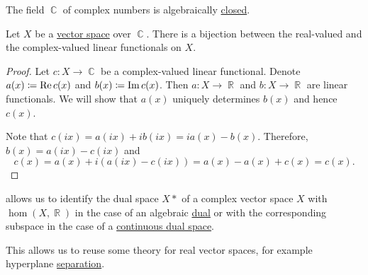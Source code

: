 \begin{theorem}\label{thm:fundamental_theorem_of_algebra}
  The field \( \BbbC \) of complex numbers is algebraically \hyperref[def:algebraically_closed_field]{closed}.
\end{theorem}

\begin{theorem}\label{thm:linear_functionals_over_c}
  Let \( X \) be a \hyperref[def:vector_space]{vector space} over \( \BbbC \). There is a bijection between the real-valued and the complex-valued linear functionals on \( X \).
\end{theorem}
\begin{proof}
  Let \( c: X \to \BbbC \) be a complex-valued linear functional. Denote \( a(x) \coloneqq \operatorname{Re} c(x) \) and \( b(x) \coloneqq \operatorname{Im} c(x) \). Then \( a: X \to \BbbR \) and \( b: X \to \BbbR \) are linear functionals. We will show that \( a(x) \) uniquely determines \( b(x) \) and hence \( c(x) \).

  Note that \( c(ix) = a(ix) + i b(ix) = i a(x) - b(x) \). Therefore, \( b(x) = a(ix) - c(ix) \) and
  \begin{equation*}
    c(x) = a(x) + i (a(ix) - c(ix)) = a(x) - a(x) + c(x) = c(x).
  \end{equation*}
\end{proof}

\begin{remark}\label{rem:linear_functionals_over_c}
   allows us to identify the dual space \( X* \) of a complex vector space \( X \) with \( \hom(X, \BbbR) \) in the case of an algebraic \hyperref[def:dual_vector_space]{dual} or with the corresponding subspace in the case of a \hyperref[def:continuous_dual_space]{continuous dual space}.

  This allows us to reuse some theory for real vector spaces, for example hyperplane \hyperref[def:hyperplane_separation]{separation}.
\end{remark}

